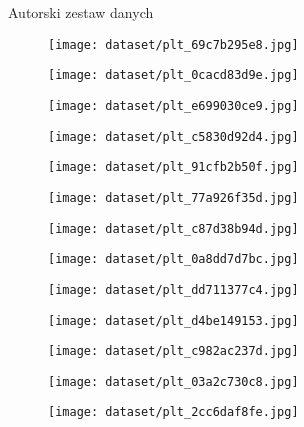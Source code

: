 \begin{easyappendix}{Autorski zestaw danych}

    \begin{figure}[H]
        \centering
        \texttt{[image: dataset/plt\_69c7b295e8.jpg]}
    \end{figure}
    \begin{figure}[H]
        \centering
        \texttt{[image: dataset/plt\_0cacd83d9e.jpg]}
    \end{figure}
    \begin{figure}[H]
        \centering
        \texttt{[image: dataset/plt\_e699030ce9.jpg]}
    \end{figure}
    \begin{figure}[H]
        \centering
        \texttt{[image: dataset/plt\_c5830d92d4.jpg]}
    \end{figure}
    \begin{figure}[H]
        \centering
        \texttt{[image: dataset/plt\_91cfb2b50f.jpg]}
    \end{figure}
    \begin{figure}[H]
        \centering
        \texttt{[image: dataset/plt\_77a926f35d.jpg]}
    \end{figure}
    \begin{figure}[H]
        \centering
        \texttt{[image: dataset/plt\_c87d38b94d.jpg]}
    \end{figure}
    \begin{figure}[H]
        \centering
        \texttt{[image: dataset/plt\_0a8dd7d7bc.jpg]}
    \end{figure}
    \begin{figure}[H]
        \centering
        \texttt{[image: dataset/plt\_dd711377c4.jpg]}
    \end{figure}
    \begin{figure}[H]
        \centering
        \texttt{[image: dataset/plt\_d4be149153.jpg]}
    \end{figure}
    \begin{figure}[H]
        \centering
        \texttt{[image: dataset/plt\_c982ac237d.jpg]}
    \end{figure}
    \begin{figure}[H]
        \centering
        \texttt{[image: dataset/plt\_03a2c730c8.jpg]}
    \end{figure}
    \begin{figure}[H]
        \centering
        \texttt{[image: dataset/plt\_2cc6daf8fe.jpg]}
    \end{figure}

\end{easyappendix}